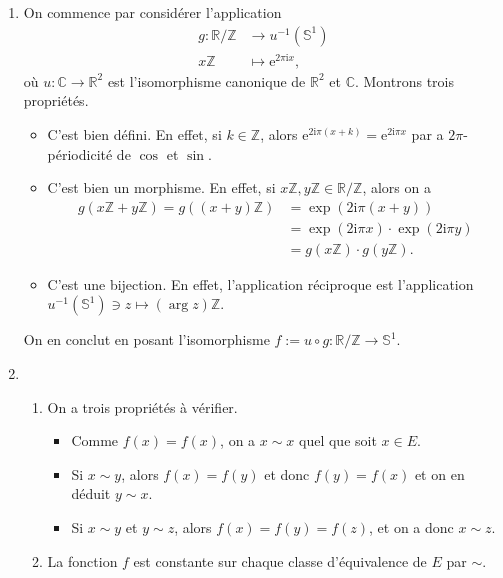 \documentclass[./main]{subfiles}
\begin{document}
  \begin{enumerate}
    \item On commence par considérer l'application 
      \begin{align*}
        g: \mathds{R}/\mathds{Z} &\longrightarrow u^{-1}(\mathds{S}^1) \\
        x\mathds{Z} &\longmapsto \mathrm{e}^{2\pi\mathrm{i} x}
      ,\end{align*}
      où $u : \mathds{C} \to \mathds{R}^2$ est l'isomorphisme canonique de $\mathds{R}^2$ et $\mathds{C}$.
      Montrons trois propriétés.
      \begin{itemize}
        \item C'est bien défini. En effet, si $k \in \mathds{Z}$, alors $\mathrm{e}^{2\mathrm{i}\pi (x + k)} = \mathrm{e}^{2 \mathrm{i} \pi x}$ par a $2\pi$-périodicité de $\cos$ et $\sin$.
        \item C'est bien un morphisme. En effet, si $x\mathds{Z}, y\mathds{Z} \in \mathds{R} / \mathds{Z}$, alors on a
          \begin{align*}
            g(x\mathds{Z} + y\mathds{Z}) = g((x+y)\mathds{Z}) &= \exp(2 \mathrm{i} \pi(x+y))\\
            &= \exp(2 \mathrm{i}\pi x) \cdot \exp(2 \mathrm{i} \pi y)\\
            &= g(x\mathds{Z}) \cdot g(y\mathds{Z})
          .\end{align*}
        \item C'est une bijection. En effet, l'application réciproque est l'application $u^{-1}(\mathds{S}^1) \ni z \mapsto (\arg z) \mathds{Z}$.
      \end{itemize}
      On en conclut en posant l'isomorphisme $f := u \circ g : \mathds{R} / \mathds{Z} \to \mathds{S}^1$.
    \item
      \begin{enumerate}
        \item On a trois propriétés à vérifier.
          \begin{itemize}
            \item Comme $f(x) = f(x)$, on a $x \sim x$ quel que soit $x \in E$.
            \item Si $x \sim y$, alors  $f(x) = f(y)$ et donc  $f(y) = f(x)$ et on en déduit $y \sim x$.
            \item  Si $x \sim y$ et $y \sim z$, alors $f(x) = f(y) = f(z)$, et on a donc  $x \sim z$.
          \end{itemize}
        \item La fonction $f$ est constante sur chaque classe d'équivalence de $E$ par $\sim$.

\end{enumerate}
\end{enumerate}
\end{document}
